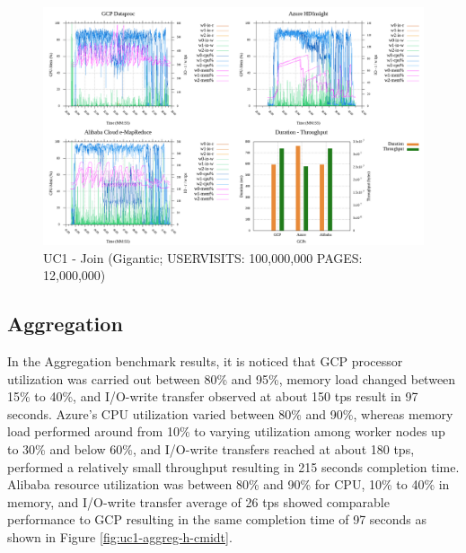 \documentclass[review]{elsarticle}
\begin{document}
\begin{figure}[p]
	\caption{UC1 - Join (Gigantic; USERVISITS: 100,000,000 PAGES: 12,000,000)}
	\label{fig:uc1-join-g-cmidt}
	\includegraphics[width=\textwidth]{uc1-join-g-cmidt}
	\centering
\end{figure}


\subsection{Aggregation}
In the Aggregation benchmark results, it is noticed that GCP processor utilization was carried out between 80\% and 95\%, memory load changed between 15\% to 40\%, and I/O-write transfer observed at about 150 tps result in 97 seconds. Azure's CPU utilization varied between 80\% and 90\%, whereas memory load performed around from 10\% to varying utilization among worker nodes up to 30\% and below 60\%, and I/O-write transfers reached at about 180 tps, performed a relatively small throughput resulting in 215 seconds completion time. Alibaba resource utilization was between 80\% and 90\% for CPU, 10\% to 40\% in memory, and I/O-write transfer average of 26 tps showed comparable performance to GCP resulting in the same completion time of 97 seconds as shown in Figure \ref{fig:uc1-aggreg-h-cmidt}.
\end{document}
